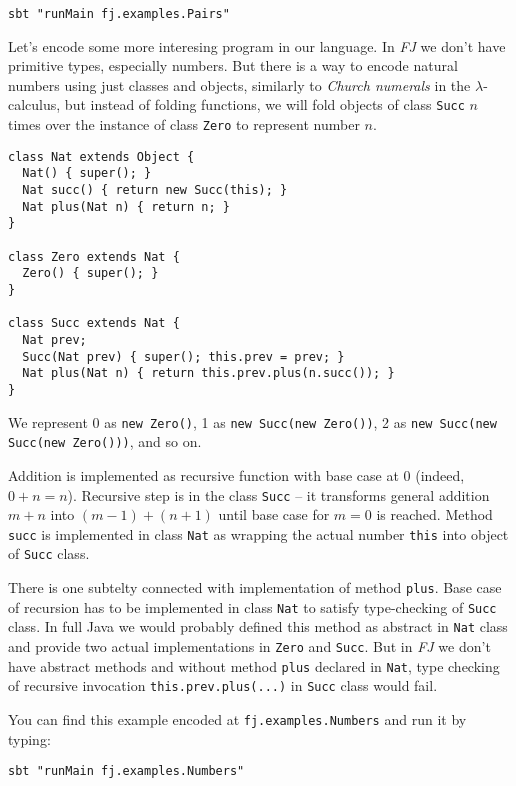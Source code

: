 \documentclass{article}[12pt]
\begin{document}
\begin{verbatim}
sbt "runMain fj.examples.Pairs"
\end{verbatim}

Let's encode some more interesing program in our language. In
\emph{FJ} we don't have primitive types, especially numbers.
But there is a way to encode natural numbers using just classes
and objects, similarly to \emph{Church numerals} in
the $\lambda$-calculus, but instead of folding functions, we
will fold objects of class \texttt{Succ} $n$ times over the
instance of class \texttt{Zero} to represent number $n$.

\begin{verbatim}
class Nat extends Object {
  Nat() { super(); }
  Nat succ() { return new Succ(this); }
  Nat plus(Nat n) { return n; }
}

class Zero extends Nat { 
  Zero() { super(); }
}

class Succ extends Nat {
  Nat prev;
  Succ(Nat prev) { super(); this.prev = prev; }
  Nat plus(Nat n) { return this.prev.plus(n.succ()); }
}
\end{verbatim}

We represent 0 as \texttt{new Zero()},
1 as \texttt{new Succ(new Zero())},
2 as \texttt{new Succ(new Succ(new Zero()))}, and so on.

Addition is implemented as recursive function with base case
at 0 (indeed, $0 + n = n$). Recursive step is in the class
\texttt{Succ} -- it transforms general addition $m + n$ into
$(m-1) + (n+1)$ until base case for $m = 0$ is reached.
Method \texttt{succ} is implemented in class \texttt{Nat} as
wrapping the actual number \texttt{this} into object of
\texttt{Succ} class.

There is one subtelty connected with implementation of method
\texttt{plus}. Base case of recursion has to be implemented in
class \texttt{Nat} to satisfy type-checking of \texttt{Succ}
class. In full Java we would probably defined this method as
abstract in \texttt{Nat} class and provide two actual
implementations in \texttt{Zero} and \texttt{Succ}. But in
\emph{FJ} we don't have abstract methods and without method
\texttt{plus} declared in \texttt{Nat}, type checking of
recursive invocation \texttt{this.prev.plus(...)} in
\texttt{Succ} class would fail.

You can find this example encoded at \texttt{fj.examples.Numbers}
and run it by typing:

\begin{verbatim}
sbt "runMain fj.examples.Numbers"
\end{verbatim}
\end{document}
